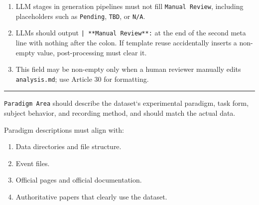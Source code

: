 \begin{tcolorbox}
\smallskip{}\par\smallskip

\begin{enumerate}[leftmargin=1.5em,noitemsep,topsep=2pt]
\item LLM stages in generation pipelines must not fill \texttt{Manual Review}, including placeholders such as \texttt{Pending}, \texttt{TBD}, or \texttt{N/A}.
\item LLMs should output \texttt{| **Manual Review**:} at the end of the second meta line with nothing after the colon. If template reuse accidentally inserts a non-empty value, post-processing must clear it.
\item This field may be non-empty only when a human reviewer manually edits \texttt{analysis.md}; use Article 30 for formatting.
\end{enumerate}

\medskip{}
\par\nopagebreak\noindent\rule{\linewidth}{0.4pt}\par\smallskip

\smallskip{}\par\smallskip

\noindent \texttt{Paradigm Area} should describe the dataset`s experimental paradigm, task form, subject behavior, and recording method, and should match the actual data.\par\smallskip

\smallskip{}\par\smallskip

\noindent Paradigm descriptions must align with:\par\smallskip

\begin{enumerate}[leftmargin=1.5em,noitemsep,topsep=2pt]
\item Data directories and file structure.
\item Event files.
\item Official pages and official documentation.
\item Authoritative papers that clearly use the dataset.
\end{enumerate}

\smallskip{}\par\smallskip


\end{tcolorbox}
